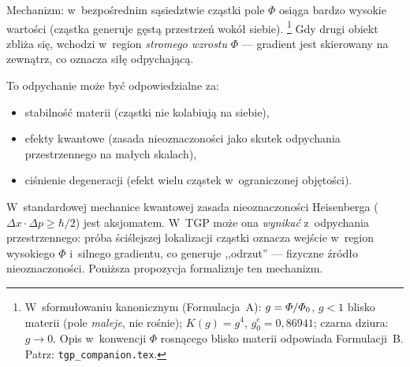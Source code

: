 Mechanizm: w~bezpo\'srednim s\k{a}siedztwie cz\k{a}stki pole $\Phi$
osi\k{a}ga bardzo wysokie warto\'sci (cz\k{a}stka generuje g\k{e}st\k{a}
przestrze\'n wok\'o\l{} siebie).%
\footnote{W~sformu\l{}owaniu kanonicznym (Formulacja~A): $g = \varPhi/\varPhi_0$,
$g < 1$ blisko materii (pole \emph{maleje}, nie ro\'snie);
$K(g) = g^4$, $g_0^e = 0{,}86941$; czarna dziura: $g \to 0$.
Opis w~konwencji $\Phi$ rosn\k{a}cego blisko materii odpowiada Formulacji~B.
Patrz: \texttt{tgp\_companion.tex}.}
Gdy drugi obiekt zbli\.za si\k{e},
wchodzi w~region \emph{stromego wzrostu} $\Phi$ --- gradient
jest skierowany na zewn\k{a}trz, co oznacza si\l{}\k{e} odpychaj\k{a}c\k{a}.

To odpychanie mo\.ze by\'c odpowiedzialne za:
\begin{itemize}[nosep]
  \item stabilno\'s\'c materii (cz\k{a}stki nie kolabiuj\k{a} na siebie),
  \item efekty kwantowe (zasada nieoznaczono\'sci jako skutek
        odpychania przestrzennego na ma\l{}ych skalach),
  \item ci\'snienie degeneracji (efekt wielu cz\k{a}stek
        w~ograniczonej obj\k{e}to\'sci).
\end{itemize}

\begin{remark}
W~standardowej mechanice kwantowej zasada nieoznaczono\'sci
Heisenberga ($\Delta x \cdot \Delta p \geq \hbar/2$) jest
aksjomatem. W~TGP mo\.ze ona \emph{wynika\'c} z~odpychania
przestrzennego: pr\'oba \'sci\'slejszej lokalizacji cz\k{a}stki
oznacza wej\'scie w~region wysokiego $\Phi$ i~silnego gradientu,
co generuje ,,odrzut'' --- fizyczne \'zr\'od\l{}o nieoznaczono\'sci.
Poni\.zsza propozycja formalizuje ten mechanizm.
\end{remark}

